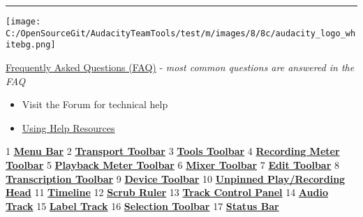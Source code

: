 
\par\vspace{1mm}\hrule
\par\texttt{[image: C:/OpenSourceGit/AudacityTeamTools/test/m/images/8/8c/audacity\_logo\_whitebg.png]}\par

\hyperref[\foo{man:faq:}]{Frequently Asked Questions (FAQ)}
  -  \textit{most common questions are answered in the FAQ}
\begin{itemize}
\item Visit the Forum for technical help
\item 
\hyperref[\foo{man:how:to:get:help:}]{Using Help Resources}
\end{itemize}

\label{index:reference}1\textbf{
\hyperref[\foo{man:menu:reference:}]{Menu Bar}
}2\textbf{
\hyperref[\foo{man:transport:toolbar:}]{Transport Toolbar}
}3\textbf{
\hyperref[\foo{man:tools:toolbar:}]{Tools Toolbar}
}4\textbf{
\hyperref[\foo{man:meter:toolbar:recording}]{Recording Meter Toolbar}
}5\textbf{
\hyperref[\foo{man:meter:toolbar:playback}]{Playback Meter Toolbar}
}6\textbf{
\hyperref[\foo{man:mixer:toolbar:}]{Mixer Toolbar}
}7\textbf{
\hyperref[\foo{man:edit:toolbar:}]{Edit Toolbar}
}8\textbf{
\hyperref[\foo{man:transcription:toolbar:}]{Transcription Toolbar}
}9\textbf{
\hyperref[\foo{man:device:toolbar:}]{Device Toolbar}
}10\textbf{
\hyperref[\foo{man:timeline:pinned}]{Unpinned Play/Recording Head}
}11\textbf{
\hyperref[\foo{man:timeline:}]{Timeline}
}12\textbf{
\hyperref[\foo{man:scrubbing:and:seeking:scrubbing}]{Scrub Ruler}
}13\textbf{
\hyperref[\foo{man:track:control:panel:and:vertical:scale:}]{Track Control Panel}
}14\textbf{
\hyperref[\foo{man:audio:tracks:}]{Audio Track}
}15\textbf{
\hyperref[\foo{man:label:tracks:}]{Label Track}
}16\textbf{
\hyperref[\foo{man:selection:toolbar:}]{Selection Toolbar}
}17\textbf{
\hyperref[\foo{man:status:bar:}]{Status Bar}
}


